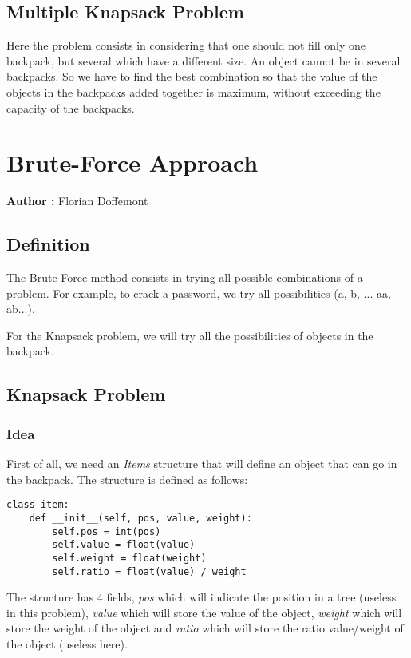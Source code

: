 \documentclass[12pt]{article}
\begin{document}
    \subsection{Multiple Knapsack Problem}
        Here the problem consists in considering that one should not fill only one backpack, but several which have a different size. An object cannot be in several backpacks. So we have to find the best combination so that the value of the objects in the backpacks added together is maximum, without exceeding the capacity of the backpacks.

\section{Brute-Force Approach}

    \textbf{Author :} Florian Doffemont

    \subsection{Definition}
        The Brute-Force method consists in trying all possible combinations of a problem. For example, to crack a password, we try all possibilities (a, b, ... aa, ab...).

        For the Knapsack problem, we will try all the possibilities of objects in the backpack.
    
    \subsection{Knapsack Problem}
    
        \subsubsection{Idea}
            First of all, we need an \emph{Items} structure that will define an object that can go in the backpack. The structure is defined as follows:

            \bigskip
            \begin{lstlisting}
class item:
    def __init__(self, pos, value, weight):
        self.pos = int(pos)
        self.value = float(value)
        self.weight = float(weight)
        self.ratio = float(value) / weight
            \end{lstlisting}
            \bigskip
            
            The structure has 4 fields, \emph{pos} which will indicate the position in a tree (useless in this problem), \emph{value} which will store the value of the object, \emph{weight} which will store the weight of the object and \emph{ratio} which will store the ratio value/weight of the object (useless here).\newline
\end{document}
